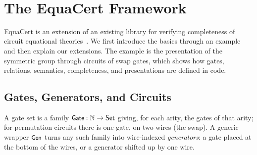 \begin{code}[hide]
\AgdaSymbol{\{}\AgdaSymbol{\}}\AgdaSpace{}%
\AgdaSymbol{\{}\AgdaSpace{}%
\AgdaSymbol{:}\AgdaSpace{}%
\AgdaSpace{}%
\AgdaSymbol{\}}\AgdaSpace{}%
\AgdaSpace{}%
\<%
\\
%
\>[2]\AgdaSpace{}%
\AgdaSymbol{:}\AgdaSpace{}%
\AgdaSymbol{\{}\AgdaSpace{}%
\AgdaSymbol{:}\AgdaSpace{}%
\AgdaSpace{}%
\AgdaSpace{}%
\AgdaSymbol{\}}\AgdaSpace{}%
\AgdaSpace{}%
\AgdaSymbol{(}\AgdaSpace{}%
\AgdaSpace{}%
\AgdaSpace{}%
\AgdaSpace{}%
\AgdaSymbol{)}\AgdaSpace{}%
\AgdaSpace{}%
\AgdaSpace{}%
\AgdaSymbol{(}\AgdaSpace{}%
\AgdaSpace{}%
\AgdaSymbol{)}\<%
\end{code}
\section{The EquaCert Framework}\label{sec:form}

EquaCert is an extension of an existing library for verifying
completeness of circuit equational theories~\cite{bian2027popl}. We
first introduce the basics through an example and then explain our
extensions. The example is the presentation of the symmetric group through circuits
of swap gates, which shows how gates, relations,
semantics, completeness, and presentations are defined in code.
\subsection{Gates, Generators, and Circuits}\label{app:sn-gates}

A gate set is a family $\mbox{\textsf{\small Gate}} : \mathbb{N} \to \mathsf{Set}$
giving, for each arity, the gates of that arity; for permutation
circuits there is one gate, on two wires (the swap). A generic wrapper $\mbox{\textsf{\small Gen}}$
turns any such family into wire-indexed \emph{generators}: a gate
placed at the bottom of the wires, or a generator shifted up by one
wire.

